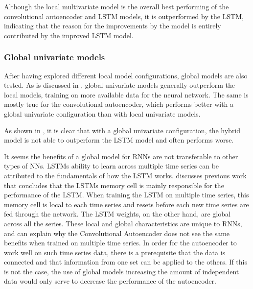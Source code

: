 Although the local multivariate model is the overall best performing of the convolutional autoencoder and LSTM models,
it is outperformed by the LSTM, indicating that the reason for the improvements by the model
is entirely contributed by the improved LSTM model.


\subsubsection{Global univariate models}


After having explored different local model configurations,
global models are also tested.
As is discussed in ,
global univariate models generally outperform the local models, training on more available data for the neural network.
The same is mostly true for the convolutional autoencoder, which performs better with a global univariate configuration than with local univariate models.

As shown in , it is clear that
with a global univariate configuration,
the hybrid model is not able to outperform the LSTM model and often performs worse.


It seems the benefits of a global model for RNNs are not transferable to other types
of NNs. LSTMs ability to learn across multiple time series can be attributed to the fundamentals
of how the LSTM works. \cite{Zhao2019} discusses previous work that concludes that
the LSTMs memory cell is mainly responsible for the performance of the LSTM.
When training the LSTM on multiple time series, this memory cell is local to each
time series and resets before each new time series are fed through the network.
The LSTM weights, on the other hand, are global across all the series.
These local and global characteristics are unique to RNNs, and can explain
why the Convolutional Autoencoder does not see the same benefits when trained on multiple
time series.
In order for the autoencoder to work well on such time series data,
there is a prerequisite that the data is connected and that information from one set can be applied to the others.
If this is not the case, the use of global models increasing the amount of independent data would only serve to decrease the performance of the autoencoder.



